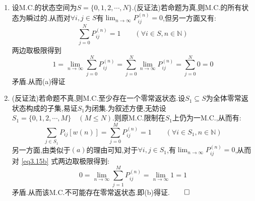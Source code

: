\begin{solution}[2(郑老师解法)]
	\begin{enumerate}[label=(\alph*)]
		\item 设M.C.的状态空间为$S=\{0,1,2,\cdots ,N\}$.(反证法)若命题为真,则M.C.的所有状态为瞬过的.从而对$\forall i,j\in S$有$\lim_{n \to \infty}P_{ij}^{(n)}=0$,但另一方面又有:
		      \[\sum_{j=0}^{N}P_{ij}^{(n)}=1\qquad (\forall i\in S,n\in \mathbb{N})\]
		      两边取极限得到
		      \[1=\lim_{n \to \infty}\sum_{j=0}^{N}P_{ij}^{(n)} = \sum_{j=0}^{N}\lim_{n \to \infty}P_{ij}^{(n)} = \sum_{j=0}^{N}0 = 0\]
		      矛盾.从而(a)得证
		\item (反证法)若命题不真,则M.C.至少存在一个零常返状态.设$S_1\subseteq S$为全体零常返状态构成的子集,易证$S_1$为闭集.为叙述方便,无妨设$S_1=\{0,1,2,\cdots ,M\}\quad (M\leqslant N)$.则原M.C.限制在$S_1$上仍为一M.C.,从而有:
		      \begin{equation}
			      \sum_{j\in S_1}P_{ij}[w(n)] = \sum_{j=0}^{M}P_{ij}^{(n)} = 1 \qquad (\forall i\in S_1,n\in \mathbb{N}) \label{eq3.15b}
		      \end{equation}
		      另一方面,由类似于$(a)$的理由可知,对于$\forall i,j\in S_1$,有$\lim_{n \to \infty}P_{ij}^{(n)} = 0$,从而对 \eqref {eq3.15b} 式两边取极限得到:
		      \[0 = \lim_{n \to \infty}\sum_{j=1}^{M}P_{ij}^{(n)} = \lim_{n \to \infty}1 = 1\]
		      矛盾.从而该M.C.不可能存在零常返状态.即(b)得证.$\qedhere$
	\end{enumerate}
\end{solution}

